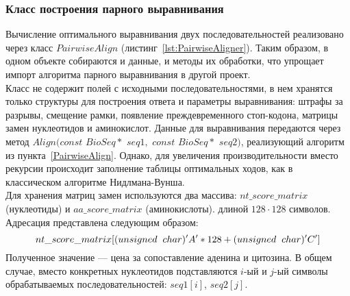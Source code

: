 \subsubsection[Класс построения парного выравнивания]{\large Класс построения парного выравнивания}
\hspace{\parindent} Вычисление оптимального выравнивания двух последовательностей реализовано через  класс $PairwiseAlign$ (листинг~\ref{lst:PairwiseAligner}). Таким образом, в одном объекте собираются и данные, и методы их обработки, что упрощает импорт алгоритма парного выравнивания в другой проект.\\
\indent Класс не содержит полей с исходными последовательностями, в нем хранятся только структуры для построения ответа и параметры выравнивания: штрафы за разрывы, смещение рамки, появление преждевременного стоп-кодона, матрицы замен нуклеотидов и аминокислот. Данные для выравнивания передаются через метод $Align(const$ $BioSeq*$ $seq1,$ $const$ $BioSeq*$ $seq2)$, реализующий алгоритм из пункта~\ref{PairwiseAlign}. Однако, для увеличения производительности вместо рекурсии происходит заполнение таблицы оптимальных ходов, как в классическом алгоритме Нидлмана-Вунша.\\
\indent Для хранения матриц замен используются два массива: $nt\_score\_matrix$ (нуклеотиды) и $aa\_score\_matrix$ (аминокислоты).  длиной $128\cdot 128$ символов. Адресация представлена следующим образом:
\begin{equation*}
nt\_score\_matrix[(unsigned\hspace{0.2cm} char)'A'*128+(unsigned\hspace{0.2cm} char)'C']
\end{equation*}
Полученное значение --- цена за сопоставление аденина и цитозина. В общем случае, вместо конкретных нуклеотидов подставляются $i$-ый и $j$-ый символы обрабатываемых последовательностей: $seq1[i]$, $seq2[j]$.

